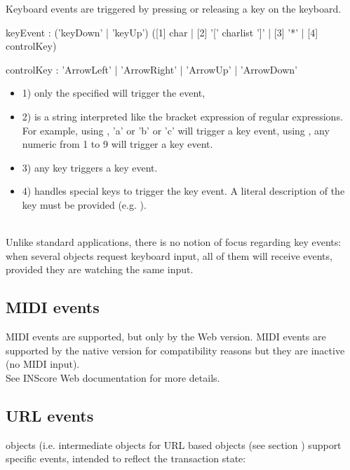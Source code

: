 \documentclass[a4paper,twoside]{report}
\newcommand{\subsublevel}[1]	{\subsection{#1}}
\begin{document}
Keyboard events are triggered by pressing or releasing a key on the keyboard.


\begin{rail}
keyEvent : 	('keyDown' | 'keyUp') ([1] char | [2] '[' charlist ']' | [3] '*' | [4] controlKey)
\end{rail}

\begin{rail}
controlKey : 'ArrowLeft' | 'ArrowRight' | 'ArrowUp' | 'ArrowDown'
\end{rail}

\begin{itemize}
\item 1) only the specified  will trigger the event,
\item 2)  is a string interpreted like the bracket expression of regular expressions. For example, using \OSC{[abc]}, 'a' or 'b' or 'c' will trigger a key event, using \OSC{[1-9]}, any numeric from 1 to 9 will trigger a key event.
\item 3) any key triggers a key event.
\item 4) handles special keys to trigger the key event. A literal description of the key must be provided (e.g. ).
\end{itemize}

\note\\
Unlike standard applications, there is no notion of focus regarding key events: when several objects request keyboard input, all of them will receive  events, provided they are watching the same input.


\subsublevel{MIDI events}
\label{midievents}

MIDI events are supported, but only by the Web version. 
MIDI events are supported by the native version for compatibility reasons but 
they are inactive (no MIDI input). \\
See INScore Web documentation for more details.


\subsublevel{URL events}
\label{urlevents}

 objects (i.e. intermediate objects for URL based objects (see section ) support specific events, intended to reflect the transaction state:
\end{document}
